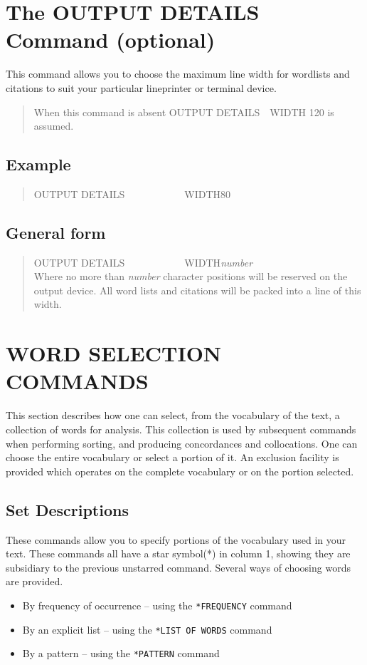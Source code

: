 \section{The OUTPUT DETAILS Command (optional)}
This command allows you to choose the maximum line width for
wordlists and citations to suit your particular lineprinter or
terminal device.
\begin{quote}
When this command is absent OUTPUT DETAILS~~WIDTH 120 is assumed.
\end{quote}

\subsection{Example}
\begin{quote}
OUTPUT DETAILS~~~~~~~~~~~~WIDTH80
\end{quote}

\subsection{General form}
\begin{quote}
OUTPUT DETAILS~~~~~~~~~~~~WIDTH{\em number}\\
Where no more than {\em number} character positions will be reserved on the
output device.  All word lists and citations will be packed into a line of this
width.
\end{quote}


\section{WORD SELECTION COMMANDS}
This section describes how one can select, from the vocabulary of
the text, a collection of words for analysis.  This collection is
used by subsequent commands when performing sorting, and
producing concordances and collocations.  One can choose the entire
vocabulary or select a portion of it.  An exclusion facility is
provided which operates on the complete vocabulary or on the portion
selected.

\subsection{Set Descriptions}
\label{sets}
These commands allow you to specify portions of the vocabulary
used in your text.
These commands all have a star symbol(*) in column 1, showing they
are subsidiary to the previous unstarred command. Several ways of
choosing words are provided. 
\begin{itemize}
\item By frequency of occurrence -- using the \verb/*FREQUENCY/ command
\item By an explicit list -- using the \verb/*LIST OF WORDS/ command
\item By a pattern -- using the \verb/*PATTERN/ command
\end{itemize}

